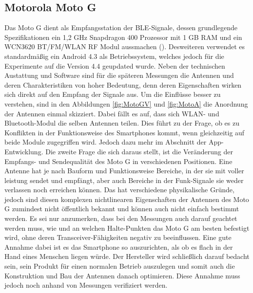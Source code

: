 \subsection{Motorola Moto G}
Das Moto G dient als Empfangsstation der BLE-Signale, dessen grundlegende Spezifikationen ein 1,2 GHz Snapdragon 400 Prozessor mit 1 GB RAM und ein WCN3620 BT/FM/WLAN RF Modul aussmachen (\cite{Moto}). Desweiteren verwendet es standardmäßig ein Android 4.3 als Betriebssystem, welches jedoch für die Experimente auf die Version 4.4 geupdated wurde. Neben der technischen Austattung und Software sind für die späteren Messungen die Antennen und deren Charakteristiken von hoher Bedeutung, denn deren Eigenschaften wirken sich direkt auf den Empfang der Signale aus. Um die Einflüsse besser zu verstehen, sind in den Abbildungen \ref{fig:MotoGV} und \ref{fig:MotoA} die Anordnung der Antennen einmal skizziert. Dabei fällt es auf, dass sich WLAN- und Bluetooth-Modul die selben Antennen teilen. Dies führt zu der Frage, ob es zu Konflikten in der Funktionsweise des Smartphones kommt, wenn gleichzeitig auf beide Module zugegriffen wird. Jedoch dazu mehr im Abschnitt der App-Entwicklung. Die zweite Frage die sich daraus stellt, ist die Veränderung der Empfangs- und Sendequalität des Moto G in verschiedenen Positionen. Eine Antenne hat je nach Bauform und Funktionsweise Bereiche, in der sie mit voller leistung sendet und empfängt, aber auch Bereiche in der Funk-Signale sie weder verlassen noch erreichen können. Das hat verschiedene physikalische Gründe, jedoch sind diesen komplexen nichtlinearen Eigenschaften der Antennen des Moto G zumindest nicht öffentlich bekannt und können auch nicht einfach bestimmt werden. Es sei nur anzumerken, dass bei den Messungen auch darauf geachtet werden muss, wie und an welchen Halte-Punkten das Moto G am besten befestigt wird, ohne deren Transceiver-Fähigkeiten negativ zu beeinflussen. Eine gute Annahme dabei ist es das Smartphone so auszurichten, als ob es flach in der Hand eines Menschen liegen würde. Der Hersteller wird schließlich darauf bedacht sein, sein Produkt für einen normalen Betrieb auszulegen und somit auch die Konstruktion und Bau der Antennen danach optimieren. Diese Annahme muss jedoch noch anhand von Messungen verifiziert werden.
